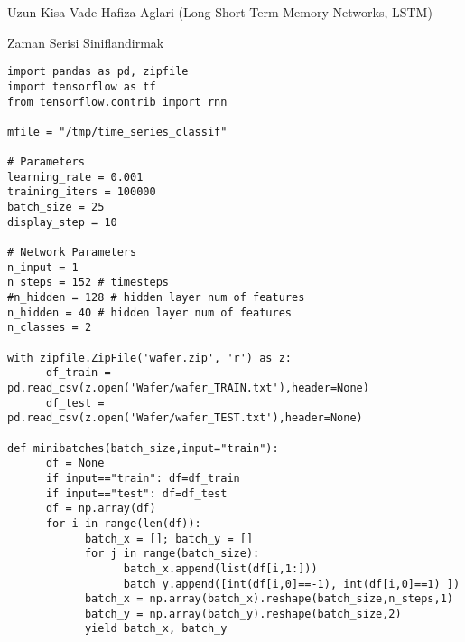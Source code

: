 \documentclass[12pt,fleqn]{article}\usepackage{../../common}
\begin{document}
Uzun Kisa-Vade Hafiza Aglari (Long Short-Term Memory Networks, LSTM)

Zaman Serisi Siniflandirmak

\begin{verbatim}
import pandas as pd, zipfile
import tensorflow as tf
from tensorflow.contrib import rnn

mfile = "/tmp/time_series_classif"

# Parameters
learning_rate = 0.001
training_iters = 100000
batch_size = 25
display_step = 10

# Network Parameters
n_input = 1 
n_steps = 152 # timesteps
#n_hidden = 128 # hidden layer num of features
n_hidden = 40 # hidden layer num of features
n_classes = 2

with zipfile.ZipFile('wafer.zip', 'r') as z:
      df_train =  pd.read_csv(z.open('Wafer/wafer_TRAIN.txt'),header=None)
      df_test =  pd.read_csv(z.open('Wafer/wafer_TEST.txt'),header=None)

def minibatches(batch_size,input="train"):
      df = None
      if input=="train": df=df_train
      if input=="test": df=df_test
      df = np.array(df)
      for i in range(len(df)):
            batch_x = []; batch_y = []
            for j in range(batch_size):
                  batch_x.append(list(df[i,1:]))
                  batch_y.append([int(df[i,0]==-1), int(df[i,0]==1) ])
            batch_x = np.array(batch_x).reshape(batch_size,n_steps,1)
            batch_y = np.array(batch_y).reshape(batch_size,2)
            yield batch_x, batch_y                  

\end{verbatim}
\end{document}
